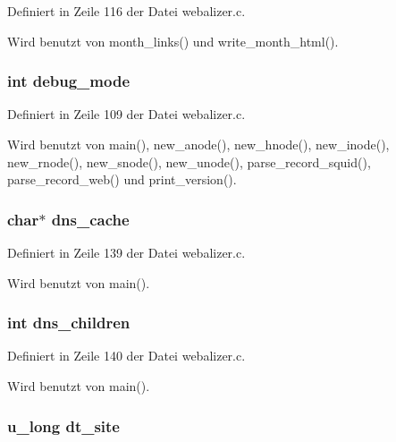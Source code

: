 Definiert in Zeile 116 der Datei webalizer.c.

Wird benutzt von month\_\-links() und write\_\-month\_\-html().
\subsubsection{\setlength{\rightskip}{0pt plus 5cm}int {\bf debug\_\-mode}}\label{webalizer_8h_4f7caf3ead45aac3963d1e354e820017}




Definiert in Zeile 109 der Datei webalizer.c.

Wird benutzt von main(), new\_\-anode(), new\_\-hnode(), new\_\-inode(), new\_\-rnode(), new\_\-snode(), new\_\-unode(), parse\_\-record\_\-squid(), parse\_\-record\_\-web() und print\_\-version().
\subsubsection{\setlength{\rightskip}{0pt plus 5cm}char$\ast$ {\bf dns\_\-cache}}\label{webalizer_8h_3cb74b5ee16f5910ee70cc4944d1300a}




Definiert in Zeile 139 der Datei webalizer.c.

Wird benutzt von main().
\subsubsection{\setlength{\rightskip}{0pt plus 5cm}int {\bf dns\_\-children}}\label{webalizer_8h_90492045766d92f08b5e160135ade65c}




Definiert in Zeile 140 der Datei webalizer.c.

Wird benutzt von main().
\subsubsection{\setlength{\rightskip}{0pt plus 5cm}u\_\-long {\bf dt\_\-site}}\label{webalizer_8h_f80cf0d40e63789f26cf6ee643eb3b4c}




